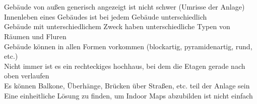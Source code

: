 \section{
}
Gebäude von außen generisch angezeigt ist nicht schwer (Umrisse der Anlage)\\
Innenleben eines Gebäudes ist bei jedem Gebäude unterschiedlich\\
Gebäude mit unterschiedlichem Zweck haben unterschiedliche Typen von Räumen und Fluren\\
Gebäude können in allen Formen vorkommen (blockartig, pyramidenartig, rund, etc.)\\
Nicht immer ist es ein rechteckiges hochhaus, bei dem die Etagen gerade nach oben verlaufen\\
Es können Balkone, Überhänge, Brücken über Straßen, etc. teil der Anlage sein\\
Eine einheitliche Lösung zu finden, um Indoor Maps abzubilden ist nicht einfach\\
